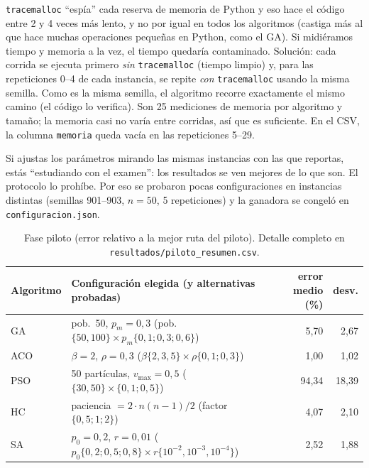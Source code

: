 \documentclass[11pt,a4paper]{article}
\newcommand{\archivo}[1]{\texttt{#1}}
\begin{document}
\begin{porque}
\texttt{tracemalloc} ``espía'' cada reserva de memoria de Python y eso hace el código entre 2 y 4 veces más lento, y no por igual en todos
los algoritmos (castiga más al que hace muchas operaciones pequeñas en Python, como el GA). Si midiéramos tiempo y memoria a la vez,
el tiempo quedaría contaminado. Solución: cada corrida se ejecuta primero \emph{sin} \texttt{tracemalloc} (tiempo limpio) y, para las
repeticiones 0--4 de cada instancia, se repite \emph{con} \texttt{tracemalloc} usando la misma semilla. Como es la misma semilla, el algoritmo
recorre exactamente el mismo camino (el código lo verifica). Son 25 mediciones de memoria por algoritmo y tamaño; la memoria casi no varía entre
corridas, así que es suficiente. En el CSV, la columna \texttt{memoria} queda vacía en las repeticiones 5--29.
\end{porque}

\begin{porque}
Si ajustas los parámetros mirando las mismas instancias con las que reportas, estás ``estudiando con el examen'': los resultados se ven mejores
de lo que son. El protocolo lo prohíbe. Por eso se probaron pocas configuraciones en instancias distintas (semillas 901--903, $n=50$, 5 repeticiones)
y la ganadora se congeló en \archivo{configuracion.json}.
\end{porque}

\begin{table}[H]\centering\small
\begin{tabular}{llrr}
\toprule
Algoritmo & Configuración elegida (y alternativas probadas) & error medio (\%) & desv.\\
\midrule
GA  & pob.\ 50, $p_m=0{,}3$ \quad (pob.\ $\{50,100\}\times p_m\{0{,}1;0{,}3;0{,}6\}$) & 5{,}70 & 2{,}67\\
ACO & $\beta=2$, $\rho=0{,}3$ \quad ($\beta\{2,3,5\}\times\rho\{0{,}1;0{,}3\}$) & 1{,}00 & 1{,}02\\
PSO & 50 partículas, $v_{\max}=0{,}5$ \quad ($\{30,50\}\times\{0{,}1;0{,}5\}$) & 94{,}34 & 18{,}39\\
HC  & paciencia $=2\cdot n(n-1)/2$ \quad (factor $\{0{,}5;1;2\}$) & 4{,}07 & 2{,}10\\
SA  & $p_0=0{,}2$, $r=0{,}01$ \quad ($p_0\{0{,}2;0{,}5;0{,}8\}\times r\{10^{-2},10^{-3},10^{-4}\}$) & 2{,}52 & 1{,}88\\
\bottomrule
\end{tabular}
\caption{Fase piloto (error relativo a la mejor ruta del piloto). Detalle completo en \archivo{resultados/piloto\_resumen.csv}.}
\end{table}
\end{document}
